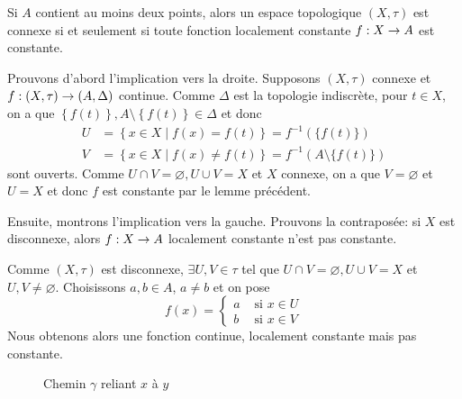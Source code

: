 \documentclass[french]{article}
\begin{document}
\begin{theoreme}
  Si $A$ contient au moins deux points, alors un espace topologique $(X, \tau)$ est connexe si et seulement si toute fonction localement constante $f: X \rightarrow A$ est constante.

  \tcblower
  \begin{preuve}
    Prouvons d'abord l'implication vers la droite. Supposons $(X, \tau)$ connexe et $f: (X, \tau) \rightarrow (A, \Delta)$ continue. Comme $\Delta$ est la topologie indiscrète, pour $t \in X$, on a que $\left\{ f(t) \right\}, A \setminus \left\{ f(t) \right\} \in \Delta$ et donc
    \begin{align*}
      U &= \left\{ x \in X \mid f(x) = f(t) \right\} = f^{-1}(\{ f(t)\}) \\
      V &= \left\{ x \in X \mid f(x) \not = f(t) \right\} = f^{-1}( A \setminus \{ f(t)\}) 
    \end{align*}
    sont ouverts. Comme $U \cap V = \varnothing , U \cup V = X$ et $X$ connexe, on a que $V = \varnothing $ et $U = X$ et donc  $f$ est constante par le lemme précédent.

    \par Ensuite, montrons l'implication vers la gauche. Prouvons la contraposée: si $X$ est disconnexe, alors $f: X \rightarrow A$ localement constante n'est pas constante.
    \par Comme $(X, \tau)$ est disconnexe, $\exists U, V \in \tau$ tel que $U \cap V = \varnothing , U \cup V = X$ et $U, V \not = \varnothing $. Choisissons $a, b \in A$, $a \not = b$ et on pose
    $$f(x) = \begin{cases}
      a & \text{ si } x\in U\\
      b & \text{ si } x \in V
    \end{cases}$$
    Nous obtenons alors une fonction continue, localement constante mais pas constante.
  \end{preuve}
\end{theoreme}
\newpage

\begin{figure}[ht]
  \centering
  \caption{Chemin $\gamma$ reliant $x$ à $y$}
\end{figure}
\end{document}

